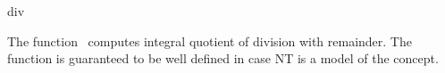 \begin{ccRefFunction}{div}

\ccDefinition

The function \ccRefName\ computes integral quotient of division with remainder.
The function is guaranteed to be well defined in case NT
is a model of the  concept. 


{}

\ccSeeAlso

\\
\\
\\
\\

\end{ccRefFunction}
